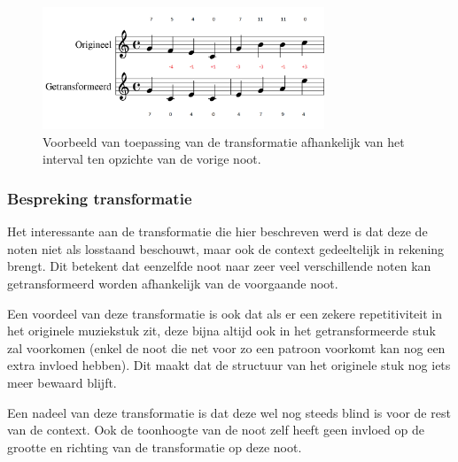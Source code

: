 \begin{figure}[!ht]
  \centering
  \includegraphics[width=0.75\textwidth]{3_Melodische_Transformatie/transfo2}
  \caption{Voorbeeld van toepassing van de transformatie afhankelijk van het interval ten opzichte van de vorige noot.}
  \label{figuur:voorbeeld_transformatie_2}
\end{figure}

\subsubsection{Bespreking transformatie}
Het interessante aan de transformatie die hier beschreven werd is dat deze de noten niet als losstaand beschouwt, maar ook de context gedeeltelijk in rekening brengt. Dit betekent dat eenzelfde noot naar zeer veel verschillende noten kan getransformeerd worden afhankelijk van de voorgaande noot. 

Een voordeel van deze transformatie is ook dat als er een zekere repetitiviteit in het originele muziekstuk zit, deze bijna altijd ook in het getransformeerde stuk zal voorkomen (enkel de noot die net voor zo een patroon voorkomt kan nog een extra invloed hebben). Dit maakt dat de structuur van het originele stuk nog iets meer bewaard blijft. 

Een nadeel van deze transformatie is dat deze wel nog steeds blind is voor de rest van de context. Ook de toonhoogte van de noot zelf heeft geen invloed op de grootte en richting van de transformatie op deze noot.  

